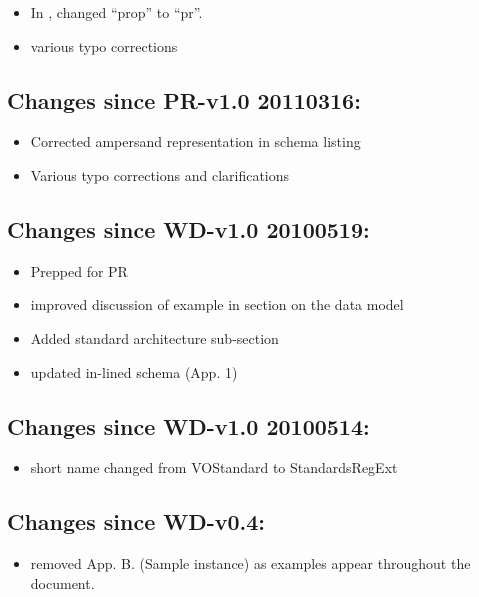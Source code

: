 \documentclass[11pt,a4paper]{ivoa}
\begin{document}
\begin{itemize}

\item  In , changed ``prop'' to ``pr''.

\item  various typo corrections

\end{itemize}

\subsection{Changes since PR-v1.0 20110316:}

\begin{itemize}

\item Corrected ampersand representation in schema listing

\item Various typo corrections and clarifications

\end{itemize}

\subsection{Changes since WD-v1.0 20100519:}

\begin{itemize}

\item  Prepped for PR

\item  improved discussion of example in section on the data model

\item  Added standard architecture sub-section

\item  updated in-lined schema (App. 1)

\end{itemize}

\subsection{Changes since WD-v1.0 20100514:}

\begin{itemize}

\item  short name changed from VOStandard to StandardsRegExt

\end{itemize}

\subsection{Changes since WD-v0.4:}

\begin{itemize}

\item  removed App. B. (Sample instance) as examples appear throughout
       the document.

\end{itemize}


\end{document}
